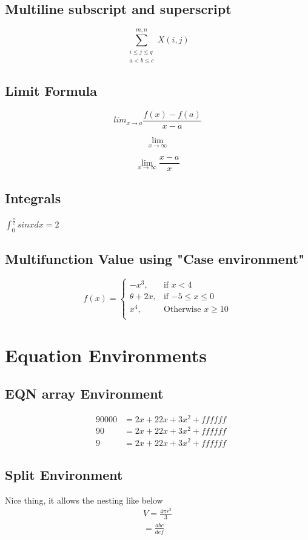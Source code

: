 \documentclass{article}
\begin{document}
	\subsection{Multiline subscript and superscript}
	\[  \sum_{\substack{i \leq j \leq q     \\  a <b \leq c      }}^{m,n} X(i,j)   \]
	
	\subsection{Limit Formula}
	\[  lim_{x\to a}  \frac{f(x)-f(a)}{x-a}  \]
	
	
	\[     \lim\limits_{x \to \infty}    \]
	
	
	\[     \lim\limits_{x \to \infty}   \frac{x-a}{x} \]
	
	
	\subsection{Integrals}
	 $ \int_{0}^{\frac{\pi}{2}}  sinx dx = 2 $
	 
	 
	 \subsection{Multifunction Value using "Case environment"}
	 	\[
	 	f(x) = 
	 			\begin{cases}
	 	        -x^3   ,& \text{if $x<4$} \\
	 	        \theta+2x  ,& \text{if $-5 \leq x \leq 0$} \\
	 	        x^4    ,& \text{Otherwise $x \geq 10$}  \\
	           \end{cases}
      \]
	 
	 \section{Equation Environments}
	 
	 \subsection{EQN array Environment}
	 	\begin{eqnarray}
	     &90000&= 2x + 22x + 3x^2 + ffffff \\
	     	 &90&= 2x + 22x + 3x^2 + ffffff \\
	     	 &9&= 2x + 22x + 3x^2 + ffffff
	 	\end{eqnarray}
	 	
	 	\subsection{Split Environment}
	 	Nice thing, it allows the nesting like below
	 	\begin{equation}
	 	\begin{split}
	 	V= \frac{4\pi r^3}{3} \\
	 	=\frac{abc}{def}
	 	\end{split}
	 	\end{equation}
	 	
\end{document}
